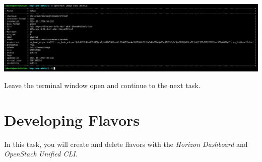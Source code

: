 \documentclass[letterpaper, 12pt]{article}
\begin{document}
\begin{enumerate}
\begin{labstep}
        \begin{center}
            \includegraphics[width=\linewidth]{images/part1/step23.png}
        \end{center}
    \end{labstep}

    \begin{labstep}
        Leave the terminal window open and continue to the next task.
    \end{labstep}

\end{enumerate}

\section{Developing Flavors}\label{sec:developing-flavors}
In this task, you will create and delete flavors with the \textit{Horizon Dashboard} and \textit{OpenStack Unified CLI}.
\end{document}
